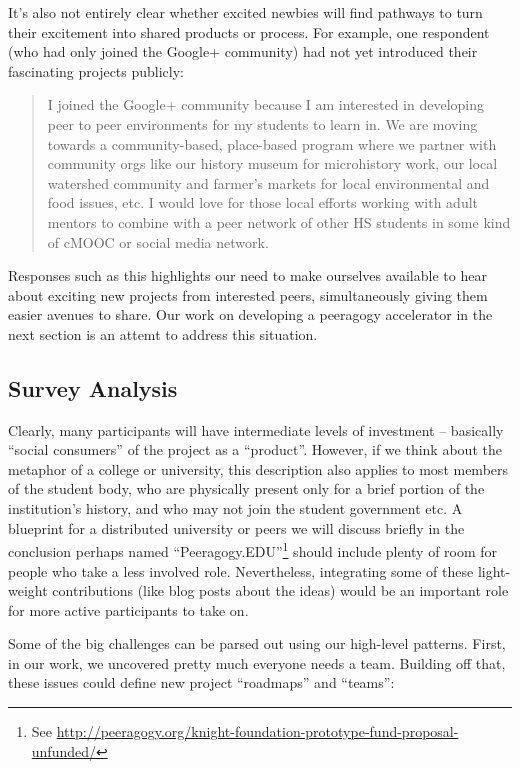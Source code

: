 \documentclass{acm_proc_article-sp}
\begin{document}
It's also not entirely clear whether excited newbies will find pathways to turn their excitement into shared products or process. For example, one respondent (who had only joined the Google+ community) had not yet introduced their fascinating projects publicly:

\begin{quote}
I joined the Google+ community because I am interested in developing peer to peer environments for my students to learn in. We are moving towards a community-based, place-based program where we partner with community orgs like our history museum for microhistory work, our local watershed community and farmer's markets for local environmental and food issues, etc. I would love for those local efforts working with adult mentors to combine with a peer network of other HS students in some kind of cMOOC or social media network.
\end{quote}

Responses such as this highlights our need to make ourselves available to hear about exciting new projects from interested peers, simultaneously giving them easier avenues to share. Our work on developing a peeragogy accelerator in the next section is an attemt to address this situation.

\subsection{Survey Analysis}

Clearly, many participants will have intermediate levels of investment -- basically ``social consumers'' of the project as a ``product''. However, if we think about the metaphor of a college or university, this description also applies to most members of the student body, who are physically present only for a brief portion of the institution's history, and who may not join the student government etc. A blueprint for a distributed university or peers we will discuss briefly in the conclusion perhaps named ``Peeragogy.EDU''\footnote{See \url{http://peeragogy.org/knight-foundation-prototype-fund-proposal-unfunded/}} should include plenty of room for people who take a less involved role. Nevertheless, integrating some of these light-weight contributions (like blog posts about the ideas) would be an important role for more active participants to take on.

Some of the big challenges can be parsed out using our high-level patterns. First, in our work, we uncovered pretty much everyone needs a team. Building off that, these issues could define new project ``roadmaps'' and ``teams'':
\end{document}
